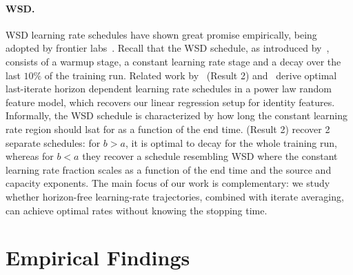 \documentclass{article}
\theoremstyle{plain}
\begin{document}
\paragraph{WSD.} WSD learning rate schedules have shown great promise empirically, being adopted by frontier labs~\citep{team2025kimi}. Recall that the WSD schedule, as introduced by~\citet{hu2024minicpm}, consists of a warmup stage, a constant learning rate stage and a decay over the last $10\%$ of the training run. Related work by~\citet{bordelon2026theory} (Result 2) and~\citet{li2026functional} derive optimal last-iterate horizon dependent learning rate schedules in a power law random feature model, which recovers our linear regression setup for identity features. Informally, the WSD schedule is characterized by how long the constant learning rate region should lsat for as a function of the end time. \citet{bordelon2026theory} (Result 2) recover 2 separate schedules: for $b > a$, it is optimal to decay for the whole training run, whereas for $b < a$ they recover a schedule resembling WSD where the constant learning rate fraction scales as a function of the end time and the source and capacity exponents. The main focus of our work is complementary: we study whether horizon-free learning-rate trajectories, combined with iterate averaging, can achieve optimal rates without knowing the stopping time. 


\section{Empirical Findings}
\label{sec:empirical_findings}
\end{document}
